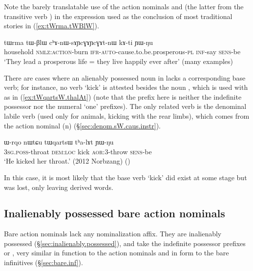 Note the barely translatable use of the action nominals  and  (the latter from the transitive verb ) in the expression used as the conclusion of most traditional stories in (\ref{ex:tWrma.tWBlW}).

\begin{exe}
\ex \label{ex:tWrma.tWBlW}
\gll  tɯrma tɯ-βlɯ cʰɤ-nɯ-sɤɲcɣɤɲcɣɤt-nɯ kɤ-ti ɲɯ-ŋu \\
household \textsc{nmlz}:\textsc{action}-burn \textsc{ifr}-\textsc{auto}-cause.to.be.prosperous-\textsc{pl} \textsc{inf}-say \textsc{sens}-be \\
\glt `They lead a prosperous life = they live happily ever after' (many examples)
\end{exe}


There are cases where an alienably possessed noun in  lacks a corresponding base verb; for instance, no verb  `kick' is attested besides the noun , which is used with  as in (\ref{ex:tWqartsW.thalAt}) (note that the  prefix here is neither the indefinite possessor nor the numeral `one' prefixes). The only related verb is the denominal labile verb  (used only for animals, kicking with the rear limbs), which comes from the action nominal  (n) (§\ref{sec:denom.sW.caus.instr}).

\begin{exe}
\ex \label{ex:tWqartsW.thalAt}
\gll  ɯ-rqo nɯtɕu tɯqartsɯ tʰa-lɤt ɲɯ-ŋu \\
\textsc{3sg}.\textsc{poss}-throat \textsc{dem}:\textsc{loc} kick \textsc{aor}:3\flobv{}-throw \textsc{sens}-be \\
\glt `He kicked her throat.' (2012 Norbzang) 	()
\end{exe}

In this case, it is most likely that the base verb  `kick' did exist at some stage but was lost, only leaving derived words.

\subsection{Inalienably possessed bare action nominals} \label{sec:bare.action.nominals}
Bare action nominals lack any nominalization affix. They are inalienably possessed (§\ref{sec:inalienably.possessed}), and take the indefinite possessor prefixes  or , very similar in function to the  action nominals and in form to the bare infinitives (§\ref{sec:bare.inf}).

